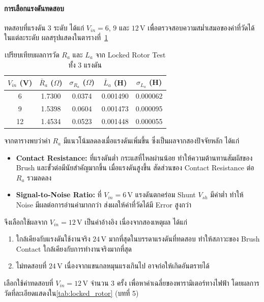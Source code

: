 \paragraph{การเลือกแรงดันทดสอบ}

ทดสอบที่แรงดัน 3 ระดับ ได้แก่ $V_{in} = 6$, $9$ และ $12$\,V 
เพื่อตรวจสอบความสม่ำเสมอของค่าที่วัดได้ในแต่ละระดับ
ผลสรุปแสดงในตารางที่~\ref{tab:locked_rotor_all}

\begin{table}[H]
  \centering
  \caption{เปรียบเทียบผลการวัด $R_a$ และ $L_a$ จาก Locked Rotor Test ทั้ง 3 แรงดัน}
  \label{tab:locked_rotor_all}
  \begin{tabular}{ccccc}
    \toprule
    $V_{in}$ (V) & $\bar{R}_a$ ($\Omega$) & $\sigma_{R_a}$ ($\Omega$) 
                 & $\bar{L}_a$ (H)        & $\sigma_{L_a}$ (H) \\
    \midrule
    6  & 1.7300 & 0.0374 & 0.001490 & 0.000062 \\
    9  & 1.5398 & 0.0604 & 0.001473 & 0.000095 \\
    12 & 1.4534 & 0.0523 & 0.001448 & 0.000055 \\
    \bottomrule
  \end{tabular}
\end{table}

จากตารางพบว่าค่า $R_a$ มีแนวโน้มลดลงเมื่อแรงดันเพิ่มขึ้น 
ซึ่งเป็นผลจากสองปัจจัยหลัก ได้แก่
\begin{itemize}
  \item \textbf{Contact Resistance:} ที่แรงดันต่ำ กระแสที่ไหลผ่านน้อย
        ทำให้ความต้านทานสัมผัสของ Brush และขั้วต่อมีนัยสำคัญมากขึ้น
        เมื่อแรงดันสูงขึ้น สัดส่วนของ Contact Resistance ต่อ $R_a$ รวมลดลง
  \item \textbf{Signal-to-Noise Ratio:} ที่ $V_{in} = 6$\,V 
        แรงดันตกคร่อม Shunt $V_{sh}$ มีค่าต่ำ ทำให้ Noise 
        มีผลต่อการอ่านค่ามากกว่า ส่งผลให้ค่าที่วัดได้มี Error สูงกว่า
\end{itemize}

จึงเลือกใช้ผลจาก $V_{in} = 12$\,V เป็นค่าอ้างอิง เนื่องจากสองเหตุผล ได้แก่
\begin{enumerate}
  \item ใกล้เคียงกับแรงดันใช้งานจริง $24$\,V มากที่สุดในบรรดาแรงดันที่ทดสอบ
        ทำให้สภาวะของ Brush Contact ใกล้เคียงกับการทำงานจริงมากที่สุด
  \item ไม่ทดสอบที่ $24$\,V เนื่องจากแขนกลหมุนแรงเกินไป อาจก่อให้เกิดอันตรายได้
\end{enumerate}

เลือกใช้ค่าทดสอบที่ $V_{in} = 12$\,V จำนวน 3 ครั้ง เพื่อหาค่าเฉลี่ยของพารามิเตอร์ทางไฟฟ้า โดยผลการวัดที่ละเอียดแสดงใน\cref{tab:locked_rotor} (บทที่ 5)

